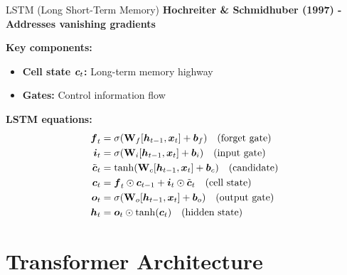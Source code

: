 \documentclass[aspectratio=169]{beamer}
\begin{document}
\begin{frame}{LSTM (Long Short-Term Memory)}
  \textbf{Hochreiter \& Schmidhuber (1997) - Addresses vanishing gradients}

  \vspace{0.5em}

  \textbf{Key components:}
  \begin{itemize}
    \item \textbf{Cell state $\boldsymbol{c}_t$:} Long-term memory highway
    \item \textbf{Gates:} Control information flow
  \end{itemize}

  \vspace{0.5em}

  \textbf{LSTM equations:}
  \begin{align}
    \boldsymbol{f}_t &= \sigma(\mathbf{W}_f [\boldsymbol{h}_{t-1}, \boldsymbol{x}_t] + \boldsymbol{b}_f) \quad \text{(forget gate)} \\
    \boldsymbol{i}_t &= \sigma(\mathbf{W}_i [\boldsymbol{h}_{t-1}, \boldsymbol{x}_t] + \boldsymbol{b}_i) \quad \text{(input gate)} \\
    \tilde{\boldsymbol{c}}_t &= \tanh(\mathbf{W}_c [\boldsymbol{h}_{t-1}, \boldsymbol{x}_t] + \boldsymbol{b}_c) \quad \text{(candidate)} \\
    \boldsymbol{c}_t &= \boldsymbol{f}_t \odot \boldsymbol{c}_{t-1} + \boldsymbol{i}_t \odot \tilde{\boldsymbol{c}}_t \quad \text{(cell state)} \\
    \boldsymbol{o}_t &= \sigma(\mathbf{W}_o [\boldsymbol{h}_{t-1}, \boldsymbol{x}_t] + \boldsymbol{b}_o) \quad \text{(output gate)} \\
    \boldsymbol{h}_t &= \boldsymbol{o}_t \odot \tanh(\boldsymbol{c}_t) \quad \text{(hidden state)}
  \end{align}
\end{frame}

\section{Transformer Architecture}
\end{document}
